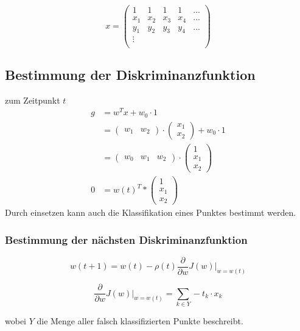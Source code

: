 \documentclass{article}
\begin{document}
$$x = \begin{pmatrix}
1 & 1 & 1 & 1 & ... \\
x_1 & x_2 & x_3 & x_4 & ...\\
y_1 & y_2 & y_3 & y_4 & ...\\
\vdots\\
\end{pmatrix}$$

\subsection{Bestimmung der Diskriminanzfunktion}

zum Zeitpunkt $t$
\begin{equation}
\begin{aligned}
	g &= w^T x+ w_{0} \cdot 1
	\\
	&= \begin{pmatrix}
	w_1 & w_2
	\end{pmatrix}
	\cdot
	\begin{pmatrix}
	x_1\\
	x_2
	\end{pmatrix}
	+ w_0 \cdot 1
	\\
	&= \begin{pmatrix}
	w_0 & w_1 & w_2 
	\end{pmatrix}
		\cdot
	\begin{pmatrix}
	1\\
	x_1\\
	x_2
	\end{pmatrix}
	\\
	0 &= 
	 w(t)^T * 
	\begin{pmatrix}
	1\\
	x_1\\
	x_2
	\end{pmatrix}
\end{aligned}
\end{equation} 
Durch einsetzen kann auch die Klassifikation eines Punktes bestimmt werden.

\subsubsection{Bestimmung der nächsten Diskriminanzfunktion}
$$ w(t+1) = w(t) -\rho(t) \frac{\partial}{\partial w} J(w) |_{w=w(t)}$$

$$ \frac{\partial}{\partial w} J(w) |_{w=w(t)} = \sum_{k \in Y}^{} -t_k \cdot x_k$$

wobei $Y$ die Menge aller falsch klassifizierten Punkte beschreibt.
\end{document}
